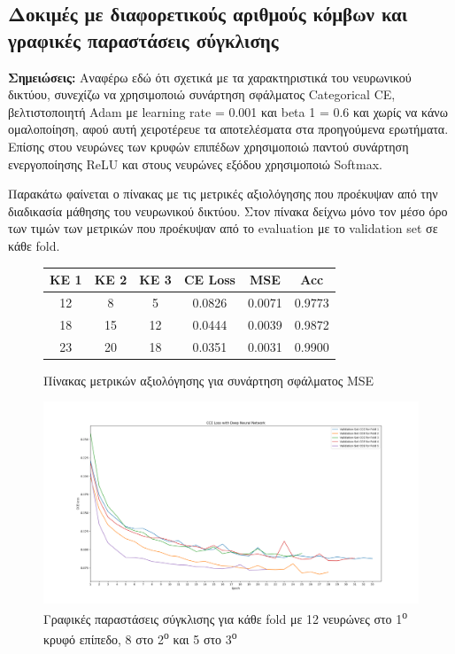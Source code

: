 \documentclass[12pt,a4paper]{article}
\begin{document}
\subsection{Δοκιμές με διαφορετικούς αριθμούς κόμβων και γραφικές παραστάσεις σύγκλισης}

\textbf{Σημειώσεις:}
Αναφέρω εδώ ότι σχετικά με τα χαρακτηριστικά του νευρωνικού δικτύου, συνεχίζω να χρησιμοποιώ συνάρτηση σφάλματος Categorical CE, βελτιστοποιητή Adam με learning rate = 0.001 και beta 1 = 0.6 και χωρίς να κάνω ομαλοποίηση, αφού αυτή χειροτέρευε τα αποτελέσματα στα προηγούμενα ερωτήματα. Επίσης στου νευρώνες των κρυφών επιπέδων χρησιμοποιώ παντού συνάρτηση ενεργοποίησης ReLU και στους νευρώνες εξόδου χρησιμοποιώ Softmax.

Παρακάτω φαίνεται ο πίνακας με τις μετρικές αξιολόγησης που προέκυψαν από την διαδικασία μάθησης του νευρωνικού δικτύου. Στον πίνακα δείχνω μόνο τον μέσο όρο των τιμών των μετρικών που προέκυψαν από το evaluation με το validation set σε κάθε fold.

\begin{figure}[H]
    \begin{center}
    \begin{tabular}{ |c|c|c|c|c|c| } 
        \hline
        \textbf{ΚΕ 1} & \textbf{ΚΕ 2} & \textbf{ΚΕ 3} & \textbf{CE Loss} & \textbf{MSE} & \textbf{Acc} \\ \hline
        12 & 8  & 5  & 0.0826 & 0.0071 & 0.9773 \\
        \hline
        18 & 15 & 12 & 0.0444 & 0.0039 & 0.9872 \\
        \hline
        23 & 20 & 18 & 0.0351 & 0.0031 & 0.9900 \\
        \hline
    \end{tabular}
    \end{center}
    \caption{Πίνακας μετρικών αξιολόγησης για συνάρτηση σφάλματος MSE}
\end{figure}

\begin{figure}[H]
	\includegraphics[width=\textwidth]{Screenshots/31. hidden layers 12 - 8 - 5.png}
    \caption{Γραφικές παραστάσεις σύγκλισης για κάθε fold με 12 νευρώνες στο 1\textsuperscript{ο} κρυφό επίπεδο, 8 στο 2\textsuperscript{ο} και 5 στο 3\textsuperscript{ο}}
\end{figure}
\end{document}
